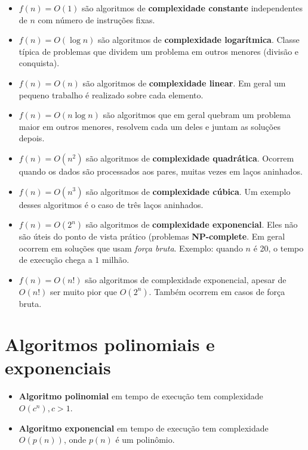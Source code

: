 \begin{itemize}
\item $f(n) = O(1)$ são algoritmos de {\bf complexidade constante}
independentes de $n$ com número de instruções fixas.

\item $f(n) = O(\log n)$ são algoritmos de {\bf complexidade logarítmica}.
Classe típica de problemas que dividem um problema em outros menores (divisão e conquista).

\item $f(n) = O(n)$ são algoritmos de {\bf complexidade linear}. Em geral 
um pequeno trabalho é realizado sobre cada elemento.

\item $f(n) = O(n \log n)$ são algoritmos que em geral quebram um problema maior em outros
menores, resolvem cada um deles e juntam as soluções depois.

\item $f(n) = O(n^2)$ são algoritmos de {\bf complexidade quadrática}. 
Ocorrem quando os dados são processados aos pares, muitas vezes em laços aninhados.

\item $f(n) = O(n^3)$ são algoritmos de \textbf{complexidade cúbica}. Um exemplo
desses algoritmos é o caso de três laços aninhados.

\item $f(n) = O(2^n)$ são algoritmos de \textbf{complexidade exponencial}. Eles
não são úteis do ponto de vista prático (problemas \textbf{NP-complete}.
Em geral ocorrem em soluções que usam \textit{força bruta}. Exemplo: quando $n$ é 20,
o tempo de execução chega a $1$ milhão.

\item $f(n) = O(n!)$ são algoritmos de complexidade exponencial, apesar
de $O(n!)$ ser muito pior que $O(2^n)$. Também ocorrem em casos de força bruta.
\end{itemize}

\section{Algoritmos polinomiais e exponenciais}

\begin{itemize}
\item {\bf Algoritmo polinomial} em tempo de execução tem complexidade $O(c^n), c > 1$.
\item {\bf Algoritmo exponencial} em tempo de execução tem complexidade $O(p(n))$, onde
$p(n)$ é um polinômio.
\end{itemize}

